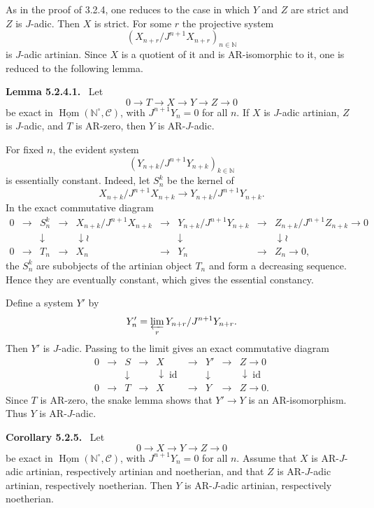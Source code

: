 \documentclass[12pt]{article}
\newcommand{\bN}{\mathbb N}
\newcommand{\cC}{\mathcal C}
\newcommand{\Hom}{\operatorname{Hom}}
\newcommand{\id}{\operatorname{id}}
\newenvironment{statement}[1]{\par\medskip\noindent\textbf{#1.}\ }{\par\medskip}
\begin{document}
As in the proof of 3.2.4, one reduces to the case in which $Y$ and $Z$ are strict
and $Z$ is $J$-adic. Then $X$ is strict. For some $r$ the projective system
\[
      (X_{n+r}/J^{n+1}X_{n+r})_{n\in\bN}
\]
is $J$-adic artinian. Since $X$ is a quotient of it and is AR-isomorphic to it, one
is reduced to the following lemma.

\begin{statement}{Lemma 5.2.4.1}
Let
\[
       0\to T\to X\to Y\to Z\to0
\]
be exact in $\underline{\Hom}(\bN^\circ,\cC)$, with $J^{n+1}Y_n=0$ for all $n$.
If $X$ is $J$-adic artinian, $Z$ is $J$-adic, and $T$ is AR-zero, then $Y$ is
AR-$J$-adic.
\end{statement}

For fixed $n$, the evident system
\[
       (Y_{n+k}/J^{n+1}Y_{n+k})_{k\in\bN}
\]
is essentially constant. Indeed, let $S_n^k$ be the kernel of
\[
       X_{n+k}/J^{n+1}X_{n+k}\longrightarrow
       Y_{n+k}/J^{n+1}Y_{n+k}.
\]
In the exact commutative diagram
\[
\begin{array}{ccccccccc}
0&\to&S_n^k&\to&X_{n+k}/J^{n+1}X_{n+k}&\to&Y_{n+k}/J^{n+1}Y_{n+k}&\to&Z_{n+k}/J^{n+1}Z_{n+k}\to0\\
 &&\downarrow&&\downarrow\wr&&\downarrow&&\downarrow\wr\\
0&\to&T_n&\to&X_n&\to&Y_n&\to&Z_n\to0,
\end{array}
\]
the $S_n^k$ are subobjects of the artinian object $T_n$ and form a decreasing
sequence. Hence they are eventually constant, which gives the essential constancy.

Define a system $Y'$ by
\[
       Y'_n=\varprojlim_r Y_{n+r}/J^{n+1}Y_{n+r}.
\]
Then $Y'$ is $J$-adic. Passing to the limit gives an exact commutative diagram
\[
\begin{array}{ccccccccc}
0&\to&S&\to&X&\to&Y'&\to&Z\to0\\
 &&\downarrow&&\downarrow\id&&\downarrow&&\downarrow\id\\
0&\to&T&\to&X&\to&Y&\to&Z\to0.
\end{array}
\]
Since $T$ is AR-zero, the snake lemma shows that $Y'\to Y$ is an AR-isomorphism.
Thus $Y$ is AR-$J$-adic.

\begin{statement}{Corollary 5.2.5}
Let
\[
       0\to X\to Y\to Z\to0
\]
be exact in $\underline{\Hom}(\bN^\circ,\cC)$, with $J^{n+1}Y_n=0$ for all $n$.
Assume that $X$ is AR-$J$-adic artinian, respectively artinian and noetherian, and
that $Z$ is AR-$J$-adic artinian, respectively noetherian. Then $Y$ is
AR-$J$-adic artinian, respectively noetherian.
\end{statement}
\end{document}
